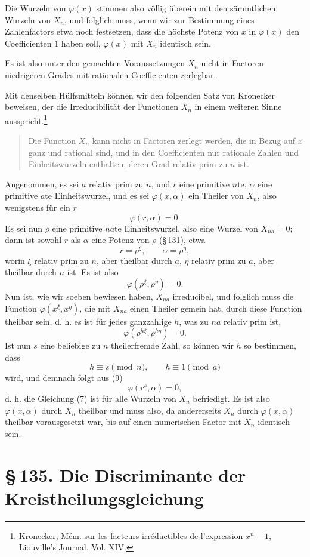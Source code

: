 \documentclass[11pt]{article}
\providecommand{\sect}[2]{\section*{\S\,#1. #2}}
\begin{document}
Die Wurzeln von $\varphi(x)$ stimmen also völlig überein mit den sämmtlichen Wurzeln von $X_n$, und folglich muss, wenn wir zur Bestimmung eines Zahlenfactors etwa noch festsetzen, dass die höchste Potenz von $x$ in $\varphi(x)$ den Coefficienten $1$ haben soll, $\varphi(x)$ mit $X_n$ identisch sein.

Es ist also unter den gemachten Voraussetzungen $X_n$ nicht in Factoren niedrigeren Grades mit rationalen Coefficienten zerlegbar.

Mit denselben Hülfsmitteln können wir den folgenden Satz von Kronecker beweisen, der die Irreducibilität der Functionen $X_n$ in einem weiteren Sinne ausspricht.\footnote{Kronecker, Mém. sur les facteurs irréductibles de l'expression $x^n-1$, Liouville's Journal, Vol. XIV.}
\begin{quote}
Die Function $X_n$ kann nicht in Factoren zerlegt werden, die in Bezug auf $x$ ganz und rational sind, und in den Coefficienten nur rationale Zahlen und Einheitswurzeln enthalten, deren Grad relativ prim zu $n$ ist.
\end{quote}
Angenommen, es sei $a$ relativ prim zu $n$, und $r$ eine primitive $n$te, $\alpha$ eine primitive $a$te Einheitswurzel, und es sei $\varphi(x,\alpha)$ ein Theiler von $X_n$, also wenigstens für ein $r$
\[
\tag{7}        \varphi(r,\alpha)=0.
\]
Es sei nun $\rho$ eine primitive $na$te Einheitswurzel, also eine Wurzel von $X_{na}=0$; dann ist sowohl $r$ als $\alpha$ eine Potenz von $\rho$ (\S\,131), etwa
\[
        r=\rho^\xi,\qquad \alpha=\rho^\eta,
\]
worin $\xi$ relativ prim zu $n$, aber theilbar durch $a$, $\eta$ relativ prim zu $a$, aber theilbar durch $n$ ist. Es ist also
\[
\tag{8}        \varphi(\rho^\xi,\rho^\eta)=0.
\]
Nun ist, wie wir soeben bewiesen haben, $X_{na}$ irreducibel, und folglich muss die Function $\varphi(x^\xi,x^\eta)$, die mit $X_{na}$ einen Theiler gemein hat, durch diese Function theilbar sein, d. h. es ist für jedes ganzzahlige $h$, was zu $na$ relativ prim ist,
\[
\tag{9}        \varphi(\rho^{h\xi},\rho^{h\eta})=0.
\]
Ist nun $s$ eine beliebige zu $n$ theilerfremde Zahl, so können wir $h$ so bestimmen, dass
\[
        h\equiv s\pmod n,\qquad h\equiv1\pmod a
\]
wird, und demnach folgt aus (9)
\[
        \varphi(r^s,\alpha)=0,
\]
d. h. die Gleichung (7) ist für alle Wurzeln von $X_n$ befriedigt. Es ist also $\varphi(x,\alpha)$ durch $X_n$ theilbar und muss also, da andererseits $X_n$ durch $\varphi(x,\alpha)$ theilbar vorausgesetzt war, bis auf einen numerischen Factor mit $X_n$ identisch sein.

\sect{135}{Die Discriminante der Kreistheilungsgleichung}
\end{document}
